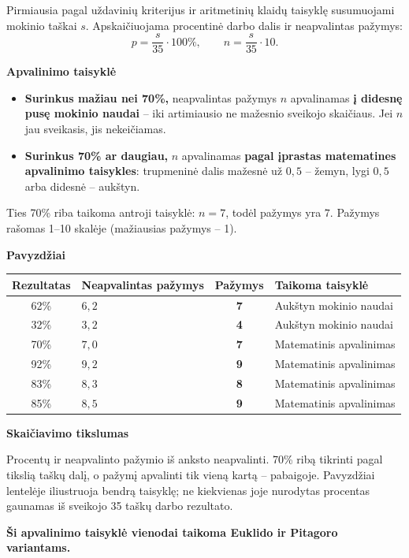 \documentclass[11pt]{article}
\newcommand{\sk}[1]{\par\medskip\textbf{#1}\par}
\begin{document}
Pirmiausia pagal uždavinių kriterijus ir aritmetinių klaidų taisyklę susumuojami mokinio taškai $s$. Apskaičiuojama procentinė darbo dalis ir neapvalintas pažymys:
\[
 p=\frac{s}{35}\cdot100\%,\qquad n=\frac{s}{35}\cdot10.
\]
\sk{Apvalinimo taisyklė}
\begin{itemize}
\item \textbf{Surinkus mažiau nei 70\%,} neapvalintas pažymys $n$ apvalinamas \textbf{į didesnę pusę mokinio naudai} -- iki artimiausio ne mažesnio sveikojo skaičiaus. Jei $n$ jau sveikasis, jis nekeičiamas.
\item \textbf{Surinkus 70\% ar daugiau,} $n$ apvalinamas \textbf{pagal įprastas matematines apvalinimo taisykles}: trupmeninė dalis mažesnė už $0{,}5$ -- žemyn, lygi $0{,}5$ arba didesnė -- aukštyn.
\end{itemize}
Ties 70\% riba taikoma antroji taisyklė: $n=7$, todėl pažymys yra $7$.
Pažymys rašomas 1--10 skalėje (mažiausias pažymys -- 1).

\sk{Pavyzdžiai}
\begin{center}\renewcommand{\arraystretch}{1.4}
\begin{tabular}{clcl}\toprule
Rezultatas & Neapvalintas pažymys & Pažymys & Taikoma taisyklė\\\midrule
62\% & $6{,}2$ & \textbf{7} & Aukštyn mokinio naudai\\
32\% & $3{,}2$ & \textbf{4} & Aukštyn mokinio naudai\\
70\% & $7{,}0$ & \textbf{7} & Matematinis apvalinimas\\
92\% & $9{,}2$ & \textbf{9} & Matematinis apvalinimas\\
83\% & $8{,}3$ & \textbf{8} & Matematinis apvalinimas\\
85\% & $8{,}5$ & \textbf{9} & Matematinis apvalinimas\\\bottomrule
\end{tabular}\end{center}

\sk{Skaičiavimo tikslumas}
Procentų ir neapvalinto pažymio iš anksto neapvalinti. 70\% ribą tikrinti pagal tikslią taškų dalį, o pažymį apvalinti tik vieną kartą -- pabaigoje.
Pavyzdžiai lentelėje iliustruoja bendrą taisyklę; ne kiekvienas joje nurodytas procentas gaunamas iš sveikojo 35 taškų darbo rezultato.

\textbf{Ši apvalinimo taisyklė vienodai taikoma Euklido ir Pitagoro variantams.}
\end{document}
